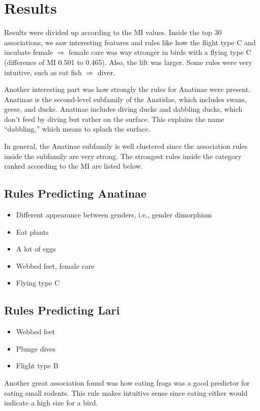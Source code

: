 \section{Results}

Results were divided up according to the MI values. Inside the top 30 associations, we saw interesting features and rules like how the flight type C and incubate female $\Rightarrow$ female care was way stronger in birds with a flying type C (difference of MI 0.501 to 0.465). Also, the lift was larger. Some rules were very intuitive, such as eat fish $\Rightarrow$ diver.

Another interesting part was how strongly the rules for Anatinae were present. Anatinae is the second-level subfamily of the Anatidae, which includes swans, geese, and ducks. Anatinae includes diving ducks and dabbling ducks, which don't feed by diving but rather on the surface. This explains the name ``dabbling,'' which means to splash the surface. \cite{johnson1999phylogeny}

In general, the Anatinae subfamily is well clustered since the association rules inside the subfamily are very strong. The strongest rules inside the category ranked according to the MI are listed below.

\subsection{Rules Predicting Anatinae}
\begin{itemize}
    \item Different appearance between genders, i.e., gender dimorphism
    \item Eat plants
    \item A lot of eggs
    \item Webbed feet, female care
    \item Flying type C
\end{itemize}

\subsection{Rules Predicting Lari}
\begin{itemize}
    \item Webbed feet
    \item Plunge dives
    \item Flight type B
\end{itemize}

Another great association found was how eating frogs was a good predictor for eating small rodents. This rule makes intuitive sense since eating either would indicate a high size for a bird.

